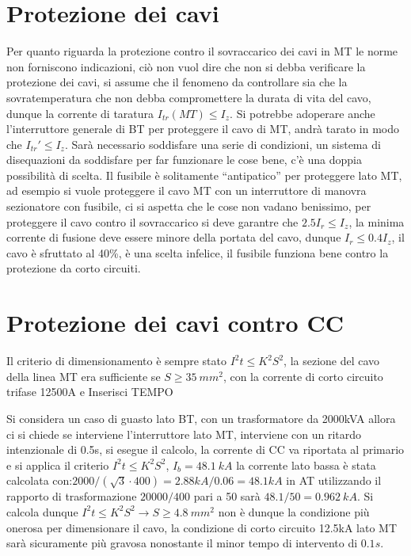 \section{Protezione dei cavi}
Per quanto riguarda la protezione contro il sovraccarico dei cavi in MT le 
norme non forniscono indicazioni, ciò non vuol dire che non si debba verificare 
la protezione dei cavi, si assume che il fenomeno da controllare sia che la 
sovratemperatura che non debba compromettere la durata di vita del cavo, dunque 
la corrente di taratura $I_{tr}(MT) \leq I_z$. Si potrebbe adoperare anche 
l'interruttore generale di BT per proteggere il cavo di MT, andrà tarato in 
modo che $I_{tr}'\leq I_z$. Sarà necessario soddisfare una serie di condizioni, 
un sistema di disequazioni da soddisfare per far funzionare le cose bene, c'è 
una doppia possibilità di scelta. Il fusibile è solitamente ``antipatico'' per 
proteggere lato MT, ad esempio si vuole proteggere il cavo MT con un 
interruttore di manovra sezionatore con fusibile, ci si aspetta che le cose non 
vadano benissimo, per proteggere il cavo contro il sovraccarico  si deve 
garantre che $2.5 I_r \leq I_z$, la minima corrente di fusione deve essere 
minore della portata del cavo, dunque $I_r \leq 0.4I_z$, il cavo è sfruttato al 
40\%, è una scelta infelice, il fusibile funziona bene contro la protezione da 
corto circuiti.

\section{Protezione dei cavi contro CC}
Il criterio di dimensionamento è sempre stato $I^2 t \leq K^2 S^2$, la sezione del cavo della linea MT era sufficiente se $S\geq 35\ mm^2$, con la corrente di corto circuito trifase 12500A e Inserisci TEMPO%

Si considera un caso di guasto lato BT, con un trasformatore da 2000kVA allora ci si chiede se interviene l'interruttore lato MT, interviene con un ritardo intenzionale di 0.5s, si esegue il calcolo, la corrente di CC va riportata al primario e si applica il criterio $I^2t\leq K^2S^2$, $I_b = 48.1\ kA$ la corrente lato bassa è stata calcolata con:$2000/(\sqrt{3}\cdot 400) =2.88kA/0.06 = 48.1kA $ in AT utilizzando il rapporto di trasformazione $20000/400$ pari a 50 sarà $48.1/50 = 0.962\ kA$.
Si calcola dunque $I^2t\leq K^2S^2 \rightarrow S \geq 4.8\ mm^2$ non è dunque la condizione più onerosa per dimensionare il cavo, la condizione di corto circuito 12.5kA lato MT sarà sicuramente più gravosa nonostante il minor tempo di intervento di $0.1s$.

